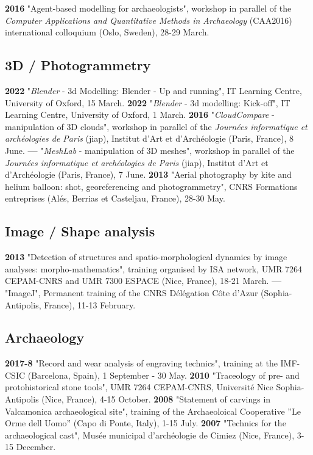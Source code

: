\documentclass{article}
\begin{document}
\textbf{2016 }"Agent-based modelling for archaeologists", workshop in parallel of the \textit{Computer Applications and Quantitative Methods in Archaeology} (CAA2016) international colloquium (Oslo, Sweden), 28-29 March.

\subsection*{3D / Photogrammetry}

\textbf{2022 }"\textit{Blender} - 3d Modelling: Blender - Up and running", IT Learning Centre, University of Oxford, 15 March.
\smallbreak
\textbf{2022 }"\textit{Blender} - 3d modelling: Kick-off", IT Learning Centre, University of Oxford, 1 March.
\smallbreak
\textbf{2016 }"\textit{CloudCompare} - manipulation of 3D clouds", workshop in parallel of the \textit{Journ\'{e}es informatique et arch\'{e}ologies de Paris} (jiap), Institut d'Art et d'Arch\'{e}ologie (Paris, France), 8 June.
\smallbreak
\textbf{--- }"\textit{MeshLab }- manipulation of 3D meshes", workshop in parallel of the \textit{Journ\'{e}es informatique et arch\'{e}ologies de Paris} (jiap), Institut d'Art et d'Arch\'{e}ologie (Paris, France), 7 June.
\smallbreak
\textbf{2013 }"Aerial photography by kite and helium balloon: shot, georeferencing and photogrammetry", CNRS Formations entreprises (Al\'{e}s, Berrias et Casteljau, France), 28-30 May.

\subsection*{Image / Shape analysis}

\textbf{2013 }"Detection of structures and spatio-morphological dynamics by image analyses: morpho-mathematics", training organised by ISA network, UMR 7264 CEPAM-CNRS and UMR 7300 ESPACE (Nice, France), 18-21 March.
\smallbreak
\textbf{--- }"ImageJ", Permanent training of the CNRS D\'{e}l\'{e}gation C\^{o}te d'Azur (Sophia-Antipolis, France), 11-13 February.

\subsection*{Archaeology}

\textbf{2017-8 } "Record and wear analysis of engraving technics", training at the IMF-CSIC (Barcelona, Spain), 1 September - 30 May.
\smallbreak
\textbf{2010 } "Traceology of pre- and protohistorical stone tools", UMR 7264 CEPAM-CNRS, Universit\'{e} Nice Sophia-Antipolis (Nice, France), 4-15 October.
\smallbreak
\textbf{2008 } "Statement of carvings in Valcamonica archaeological site", training of the Archaeoloical Cooperative ''Le Orme dell Uomo'' (Capo di Ponte, Italy), 1-15 July.
\smallbreak
\textbf{2007 } "Technics for the archaeological cast", Mus\'{e}e municipal d'arch\'{e}ologie de Cimiez (Nice, France), 3-15 December.
\end{document}
